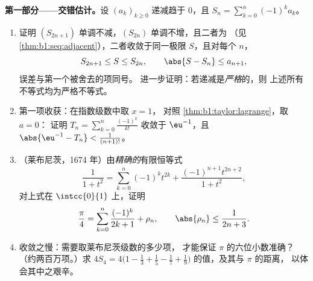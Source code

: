 \begin{problem}
\medskip
\noindent\textbf{第一部分——交错估计。}设
$(a_k)_{k \geq 0}$ 递减趋于 $0$，且 $S_n = \sum_{k=0}^{n}
(-1)^k a_k$。
\begin{enumerate}
  \item 证明 $(S_{2n+1})$ 单调不减，$(S_{2n})$
        单调不增，且二者为
        （见\cref{thm:b1:seq:adjacent}），二者收敛于同一极限
        $S$，且对每个 $n$，
        \[
        S_{2n+1} \leq S \leq S_{2n},
        \qquad
        \abs{S - S_n} \leq a_{n+1} ,
        \]
        误差与第一个被舍去的项同号。
        进一步证明：若递减是\emph{严格}的，则
        上述所有不等式均为严格不等式。
  \item 第一项收获：在指数级数中取 $x = 1$，
        对照 \cref{thm:b1:taylor:lagrange}，取 $a = 0$：
        证明 $T_n = \sum_{k=0}^{n} \frac{(-1)^k}{k!}$
        收敛于 $\eu^{-1}$，且 $\abs{\eu^{-1} - T_n} <
        \frac{1}{(n+1)!}$。
  \item （莱布尼茨，1674 年）由\emph{精确的}有限恒等式
        \[
        \frac{1}{1 + t^2} = \sum_{k=0}^{n} (-1)^k t^{2k}
        + \frac{(-1)^{n+1} t^{2n+2}}{1 + t^2} ,
        \]
        对上式在 $\intcc{0}{1}$ 上，证明
        \[
        \frac\pi4 = \sum_{k=0}^{n} \frac{(-1)^k}{2k+1} + \rho_n,
        \qquad \abs{\rho_n} \leq \frac{1}{2n+3} .
        \]
  \item 收敛之慢：需要取莱布尼茨级数的多少项，
        才能保证 $\pi$ 的六位小数准确？（约两百万项。）求 $4 S_4
        = 4\bigl(1 - \frac13 + \frac15 - \frac17 +
        \frac19\bigr)$ 的值，及其与 $\pi$ 的距离，
        以体会其中之艰辛。
\end{enumerate}


\end{problem}
